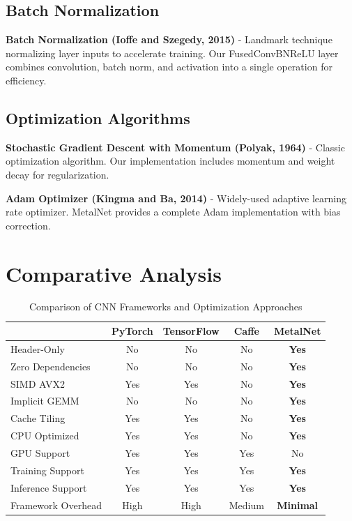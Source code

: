\documentclass[12pt,oneside,a4paper]{report}
\newcommand{\hdr}{\rowcolor{mnHeaderBg}}
\newcommand{\hcell}[1]{{\bfseries\color{white}#1}}
\newcommand{\ours}[1]{{\bfseries\color{mnAccent}#1}}
\newcommand{\zebra}{\rowcolors{2}{mnRowA}{mnRowB}}
\newenvironment{ptable}[2]{%
  \begin{table}[H]\centering
  \caption{#1}%
  \vspace{2pt}%
  \zebra
  \setlength{\arrayrulewidth}{0.5pt}%
  \begin{tabular}{#2}\toprule}%
  {\bottomrule\end{tabular}\end{table}}
\begin{document}
\subsection{Batch Normalization}

\textbf{Batch Normalization (Ioffe and Szegedy, 2015)} - Landmark technique normalizing layer inputs to accelerate training. Our FusedConvBNReLU layer combines convolution, batch norm, and activation into a single operation for efficiency.

\subsection{Optimization Algorithms}

\textbf{Stochastic Gradient Descent with Momentum (Polyak, 1964)} - Classic optimization algorithm. Our implementation includes momentum and weight decay for regularization.

\textbf{Adam Optimizer (Kingma and Ba, 2014)} - Widely-used adaptive learning rate optimizer. MetalNet provides a complete Adam implementation with bias correction.

\section{Comparative Analysis}

\begin{ptable}{Comparison of CNN Frameworks and Optimization Approaches}{l c c c c}
\hdr \hcell{Feature} & \hcell{PyTorch} & \hcell{TensorFlow} & \hcell{Caffe} & \hcell{MetalNet} \\ \midrule
Header-Only       & No         & No         & No         & \ours{Yes} \\
Zero Dependencies & No         & No         & No         & \ours{Yes} \\
SIMD AVX2         & Yes        & Yes        & No         & \ours{Yes} \\
Implicit GEMM     & No         & No         & No         & \ours{Yes} \\
Cache Tiling      & Yes        & Yes        & No         & \ours{Yes} \\
CPU Optimized     & Yes        & Yes        & No         & \ours{Yes} \\
GPU Support       & Yes        & Yes        & Yes        & No \\
Training Support  & Yes        & Yes        & Yes        & \ours{Yes} \\
Inference Support & Yes        & Yes        & Yes        & \ours{Yes} \\
Framework Overhead& High       & High       & Medium     & \ours{Minimal} \\
\end{ptable}
\end{document}
